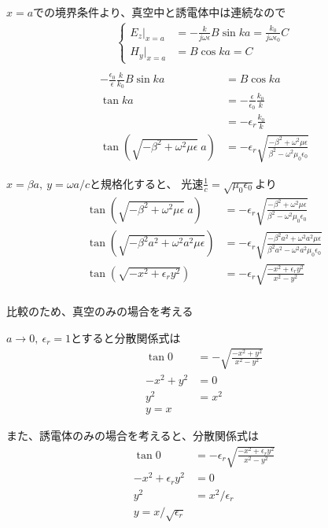 \documentclass[a4paper,10pt]{bxjsarticle}
\begin{document}
$x=a$での境界条件より、真空中と誘電体中は連続なので
\begin{align*}
    \begin{cases}
        E_z |_{x=a} &= -\frac{k}{j\omega \epsilon} B \sin ka = \frac{k_0}{j\omega \epsilon_0}C \\
        H_y |_{x=a} &= B \cos ka = C 
    \end{cases} \\
\end{align*}
\begin{align*}
    -\frac{\epsilon_0}{\epsilon} \frac{k}{k_0} B \sin ka &= B \cos ka \\
    \tan ka &= - \frac{\epsilon}{\epsilon_0} \frac{k_0}{k}\\
            &= - \epsilon_r \frac{k_0}{k} \\
    \tan (\sqrt{-\beta^2+\omega^2 \mu \epsilon}\ a) &= - \epsilon_r \sqrt{\frac{-\beta^2+\omega^2 \mu \epsilon}{\beta^2-\omega^2 \mu_0 \epsilon_0}}
\end{align*}

$x = \beta a,\ y = \omega a /c$と規格化すると、
光速$\frac{1}{c} = \sqrt{\mu_0 \epsilon_0} $より
\begin{align*}
    \tan (\sqrt{-\beta^2+\omega^2 \mu \epsilon}\ a) &= - \epsilon_r \sqrt{\frac{-\beta^2+\omega^2 \mu \epsilon}{\beta^2-\omega^2 \mu_0 \epsilon_0}} \\
    \tan (\sqrt{-\beta^2 a^2+\omega^2 a^2 \mu \epsilon} ) &= - \epsilon_r \sqrt{\frac{-\beta^2 a^2 +\omega^2 a^2 \mu \epsilon}{\beta^2 a^2 - \omega^2 a^2 \mu_0 \epsilon_0}} \\
    \tan (\sqrt{-x^2 + \epsilon_r y^2 } ) &= - \epsilon_r \sqrt{\frac{-x^2 + \epsilon_r y^2}{ x^2 - y^2}} \\
\end{align*} 

比較のため、真空のみの場合を考える

$a \rightarrow 0,\ \epsilon_r = 1$とすると分散関係式は
\begin{align*}
    \tan 0 &= - \sqrt{\frac{-x^2 + y^2}{ x^2 - y^2}} \\
    -x^2 + y^2 &= 0 \\
    y^2 &= x^2 \\ 
    y = x
\end{align*}

また、誘電体のみの場合を考えると、分散関係式は
\begin{align*}
    \tan 0 &= - \epsilon_r \sqrt{\frac{-x^2 + \epsilon_r y^2}{ x^2 - y^2}} \\
    -x^2 + \epsilon_r y^2 &= 0 \\
    y^2 &= x^2 / \epsilon_r \\ 
    y = x / \sqrt{\epsilon_r}
\end{align*}
\end{document}
